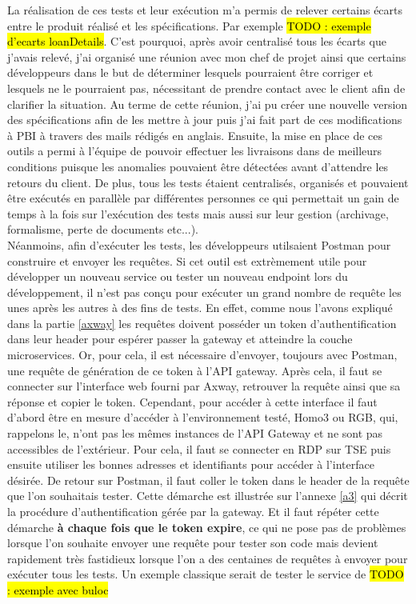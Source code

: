 	La réalisation de ces tests et leur exécution m'a permis de relever certains écarts entre le produit réalisé et les spécifications. Par exemple \hl{TODO : exemple d'ecarts loanDetails}. C'est pourquoi, après avoir centralisé tous les écarts que j'avais relevé, j'ai organisé une réunion avec mon chef de projet ainsi que certains développeurs dans le but de déterminer lesquels pourraient être corriger et lesquels ne le pourraient pas, nécessitant de prendre contact avec le client afin de clarifier la situation. Au terme de cette réunion, j'ai pu créer une nouvelle version des spécifications afin de les mettre à jour puis j'ai fait part de ces modifications à PBI à travers des mails rédigés en anglais. Ensuite, la mise en place de ces outils a permi à l'équipe de pouvoir effectuer les livraisons dans de meilleurs conditions puisque les anomalies pouvaient être détectées avant d'attendre les retours du client. De plus, tous les tests étaient centralisés, organisés et pouvaient être exécutés en parallèle par différentes personnes ce qui permettait un gain de temps à la fois sur l'exécution des tests mais aussi sur leur gestion (archivage, formalisme, perte de documents etc...). \\
	
	Néanmoins, afin d'exécuter les tests, les développeurs utilsaient Postman pour construire et envoyer les requêtes. Si cet outil est extrèmement utile pour développer un nouveau service ou tester un nouveau endpoint lors du développement, il n'est pas conçu pour exécuter un grand nombre de requête les unes après les autres à des fins de tests. En effet, comme nous l'avons expliqué dans la partie \ref{axway} les requêtes doivent posséder un token d'authentification dans leur header pour espérer passer la gateway et atteindre la couche microservices. Or, pour cela, il est nécessaire d'envoyer, toujours avec Postman, une requête de génération de ce token à l'API gateway. Après cela, il faut se connecter sur l'interface web fourni par Axway, retrouver la requête ainsi que sa réponse et copier le token. Cependant, pour accéder à cette interface il faut d'abord être en mesure d'accéder à l'environnement testé, Homo3 ou RGB, qui, rappelons le, n'ont pas les mêmes instances de l'API Gateway et ne sont pas accessibles de l'extérieur. Pour cela, il faut se connecter en RDP sur TSE puis ensuite utiliser les bonnes adresses et identifiants pour accéder à l'interface désirée. De retour sur Postman, il faut coller le token dans le header de la requête que l'on souhaitais tester. Cette démarche est illustrée sur l'annexe \ref{a3} qui décrit la procédure d'authentification gérée par la gateway. Et il faut répéter cette démarche \textbf{à chaque fois que le token expire}, ce qui ne pose pas de problèmes lorsque l'on souhaite envoyer une requête pour tester son code mais devient rapidement très fastidieux lorsque l'on a des centaines de requêtes à envoyer pour exécuter tous les tests. 
	Un exemple classique serait de tester le service de \hl{TODO : exemple avec buloc}
	
